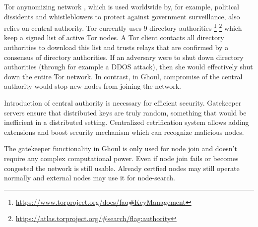   Tor anynomizing network \cite{syv04}, which is used worldwide by, for example,
  political dissidents and whistleblowers to protect against government
  surveillance, also relies on central authority. Tor currently uses 9 directory
  authorities
  \footnote{\url{https://www.torproject.org/docs/faq\#KeyManagement}}
    \footnote{\url{https://atlas.torproject.org/\#search/flag:authority}}
  which keep a signed list of active Tor nodes.
  A Tor client contacts all directory authorities to download this list and
  trusts relays that are confirmed by a consensus of directory authorities.
  If an adversary were to shut down directory authorities (through for example a
  DDOS attack), then she would effectively shut down the entire Tor network.
  In contrast, in Ghoul, compromise of the central authority would stop new
  nodes from joining the network.

  Introduction of central authority is necessary for efficient security.
  Gatekeeper servers ensure that distributed keys are truly random, something
  that would be inefficient in a distributed setting. Centralized cetrification
  system allows adding extensions and boost security mechanism which can
  recognize malicious nodes.

  The gatekeeper functionality in Ghoul is only used for node join and doesn't
  require any complex computational power. Even if node join fails or becomes
  congested the network is still usable. Already certfied nodes may still
  operate normally and external nodes may use it for node-search.
